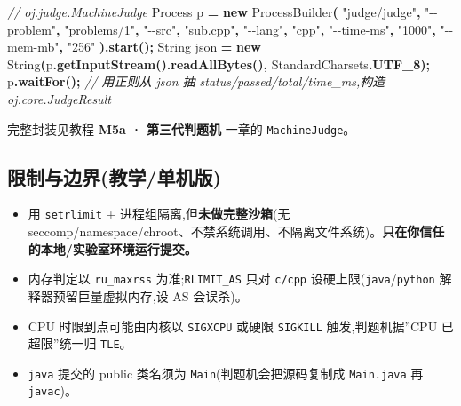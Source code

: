 \documentclass[
  11pt,
]{ctexart}
\newenvironment{Shaded}{\begin{snugshade}}{\end{snugshade}}
\newcommand{\BuiltInTok}[1]{#1}
\newcommand{\CommentTok}[1]{\textcolor[rgb]{0.56,0.35,0.01}{\textit{#1}}}
\newcommand{\FunctionTok}[1]{\textcolor[rgb]{0.13,0.29,0.53}{\textbf{#1}}}
\newcommand{\KeywordTok}[1]{\textcolor[rgb]{0.13,0.29,0.53}{\textbf{#1}}}
\newcommand{\NormalTok}[1]{#1}
\newcommand{\OperatorTok}[1]{\textcolor[rgb]{0.81,0.36,0.00}{\textbf{#1}}}
\newcommand{\StringTok}[1]{\textcolor[rgb]{0.31,0.60,0.02}{#1}}
\providecommand{\tightlist}{%
  \setlength{\itemsep}{0pt}\setlength{\parskip}{0pt}}
\begin{document}
\begin{Shaded}
\begin{Highlighting}[]
\CommentTok{// oj.judge.MachineJudge}
\BuiltInTok{Process}\NormalTok{ p }\OperatorTok{=} \KeywordTok{new} \BuiltInTok{ProcessBuilder}\OperatorTok{(}
    \StringTok{"judge/judge"}\OperatorTok{,} \StringTok{"{-}{-}problem"}\OperatorTok{,} \StringTok{"problems/1"}\OperatorTok{,} \StringTok{"{-}{-}src"}\OperatorTok{,} \StringTok{"sub.cpp"}\OperatorTok{,} \StringTok{"{-}{-}lang"}\OperatorTok{,} \StringTok{"cpp"}\OperatorTok{,}
    \StringTok{"{-}{-}time{-}ms"}\OperatorTok{,} \StringTok{"1000"}\OperatorTok{,} \StringTok{"{-}{-}mem{-}mb"}\OperatorTok{,} \StringTok{"256"}
\OperatorTok{).}\FunctionTok{start}\OperatorTok{();}
\BuiltInTok{String}\NormalTok{ json }\OperatorTok{=} \KeywordTok{new} \BuiltInTok{String}\OperatorTok{(}\NormalTok{p}\OperatorTok{.}\FunctionTok{getInputStream}\OperatorTok{().}\FunctionTok{readAllBytes}\OperatorTok{(),}\NormalTok{ StandardCharsets}\OperatorTok{.}\FunctionTok{UTF\_8}\OperatorTok{);}
\NormalTok{p}\OperatorTok{.}\FunctionTok{waitFor}\OperatorTok{();}
\CommentTok{// 用正则从 json 抽 status/passed/total/time\_ms,构造 oj.core.JudgeResult}
\end{Highlighting}
\end{Shaded}

完整封装见教程 \textbf{M5a · 第三代判题机} 一章的
\texttt{MachineJudge}。

\hypertarget{ux9650ux5236ux4e0eux8fb9ux754cux6559ux5b66ux5355ux673aux7248}{%
\subsection{限制与边界(教学/单机版)}\label{ux9650ux5236ux4e0eux8fb9ux754cux6559ux5b66ux5355ux673aux7248}}

\begin{itemize}
\tightlist
\item
  用 \texttt{setrlimit} + 进程组隔离,但\textbf{未做完整沙箱}(无
  seccomp/namespace/chroot、不禁系统调用、不隔离文件系统)。\textbf{只在你信任的本地/实验室环境运行提交。}
\item
  内存判定以 \texttt{ru\_maxrss} 为准;\texttt{RLIMIT\_AS} 只对
  \texttt{c/cpp} 设硬上限(\texttt{java}/\texttt{python}
  解释器预留巨量虚拟内存,设 AS 会误杀)。
\item
  CPU 时限到点可能由内核以 \texttt{SIGXCPU} 或硬限 \texttt{SIGKILL}
  触发,判题机据''CPU 已超限''统一归 \texttt{TLE}。
\item
  \texttt{java} 提交的 public 类名须为
  \texttt{Main}(判题机会把源码复制成 \texttt{Main.java} 再
  \texttt{javac})。
\end{itemize}
\end{document}

